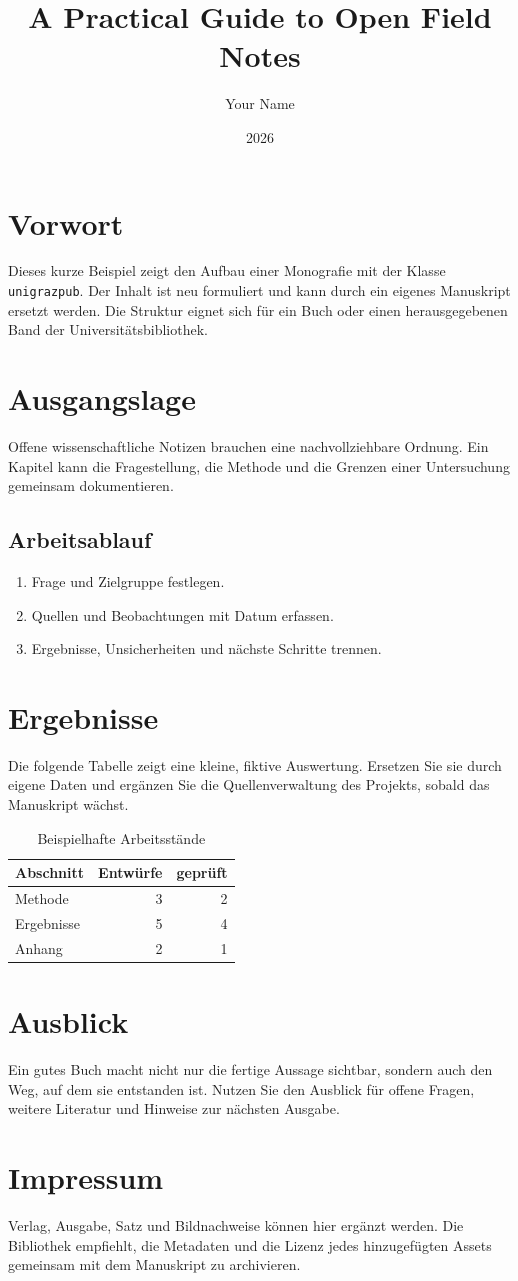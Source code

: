 \documentclass{unigrazpub}
\title{A Practical Guide to Open Field Notes}
\author{Your Name}
\date{2026}
\begin{document}
\maketitle
\chapter*{Vorwort}
Dieses kurze Beispiel zeigt den Aufbau einer Monografie mit der Klasse
\texttt{unigrazpub}. Der Inhalt ist neu formuliert und kann durch ein eigenes
Manuskript ersetzt werden. Die Struktur eignet sich für ein Buch oder einen
herausgegebenen Band der Universitätsbibliothek.
\tableofcontents
\chapter{Ausgangslage}
Offene wissenschaftliche Notizen brauchen eine nachvollziehbare Ordnung. Ein
Kapitel kann die Fragestellung, die Methode und die Grenzen einer Untersuchung
gemeinsam dokumentieren.
\section{Arbeitsablauf}
\begin{enumerate}
  \item Frage und Zielgruppe festlegen.
  \item Quellen und Beobachtungen mit Datum erfassen.
  \item Ergebnisse, Unsicherheiten und nächste Schritte trennen.
\end{enumerate}
\chapter{Ergebnisse}
Die folgende Tabelle zeigt eine kleine, fiktive Auswertung. Ersetzen Sie sie
durch eigene Daten und ergänzen Sie die Quellenverwaltung des Projekts, sobald
das Manuskript wächst.
\begin{table}[ht]
\centering
\caption{Beispielhafte Arbeitsstände}
\begin{tabular}{lrr}
\toprule
Abschnitt & Entwürfe & geprüft \\
\midrule
Methode & 3 & 2 \\
Ergebnisse & 5 & 4 \\
Anhang & 2 & 1 \\
\bottomrule
\end{tabular}
\end{table}
\chapter{Ausblick}
Ein gutes Buch macht nicht nur die fertige Aussage sichtbar, sondern auch den
Weg, auf dem sie entstanden ist. Nutzen Sie den Ausblick für offene Fragen,
weitere Literatur und Hinweise zur nächsten Ausgabe.
\chapter*{Impressum}
Verlag, Ausgabe, Satz und Bildnachweise können hier ergänzt werden. Die
Bibliothek empfiehlt, die Metadaten und die Lizenz jedes hinzugefügten Assets
gemeinsam mit dem Manuskript zu archivieren.
\end{document}
